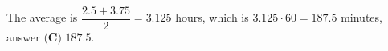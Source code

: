 The average is $\dfrac{2.5+3.75}{2}=3.125$ hours, which is $3.125\cdot60=187.5$ minutes, answer $\boxed{\textbf{(C) }187.5}$.

